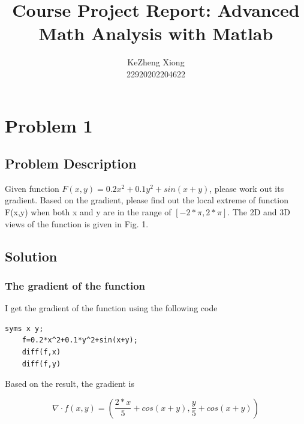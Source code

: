 \documentclass[12pt]{article}
\begin{document}
\title{Course Project Report: Advanced Math Analysis with Matlab}
\author{KeZheng Xiong \\ 22920202204622}

\maketitle


\tableofcontents

\pagebreak

\section{Problem 1}

\subsection{Problem Description}
Given function $F(x, y) = 0.2x^2 + 0.1y^2 + sin(x + y)$, please work out its
gradient. Based on the gradient, please find out the local extreme of function F(x,y)
when both x and y are in the range of $[-2*\pi, 2*\pi]$. The 2D and 3D views of the function
is given in Fig. 1. 

\subsection{Solution}

\subsubsection{The gradient of the function}

I get the gradient of the function using the following code

\begin{lstlisting}[style=MatlabStyle,caption=Gradient Calculation]
	syms x y;
	f=0.2*x^2+0.1*y^2+sin(x+y);
	diff(f,x)
	diff(f,y)
\end{lstlisting}

Based on the result, the gradient is

\begin{equation}
	\nabla \cdot f(x,y)=( \frac{2*x}{5} + cos(x + y), \frac{y}{5} + cos(x + y))
\end{equation}
\end{document}
